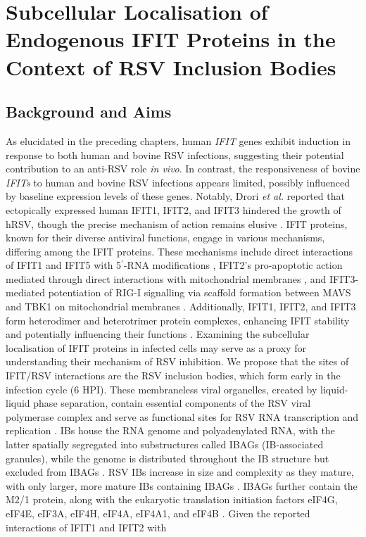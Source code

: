 \chapter{Subcellular Localisation of Endogenous IFIT Proteins in the Context of RSV Inclusion Bodies} \label{ch:Subcellular Localisation of Endogenous IFIT Proteins in the Context of RSV Inclusion Bodies}
\section{Background and Aims} \label{sec:Background and Aims-Chapter3}
As elucidated in the preceding chapters, human \textit{IFIT} genes exhibit induction in response to both human and bovine RSV infections, suggesting their potential contribution to an anti-RSV role \textit{in vivo}. In contrast, the responsiveness of bovine \textit{IFITs} to human and bovine RSV infections appears limited, possibly influenced by baseline expression levels of these genes. Notably, Drori \textit{et al.} reported that ectopically expressed human IFIT1, IFIT2, and IFIT3 hindered the growth of hRSV, though the precise mechanism of action remains elusive \cite{Drori2020InfluenzaProteins}. IFIT proteins, known for their diverse antiviral functions, engage in various mechanisms, differing among the IFIT proteins. These mechanisms include direct interactions of IFIT1 and IFIT5 with 5$^{\prime}$-RNA modifications \cite{Abbas2013StructuralProteins, Diamond2014IFIT1:Translation}, IFIT2's pro-apoptotic action mediated through direct interactions with mitochondrial membranes \cite{Chen2017InhibitionApoptosis}, and IFIT3-mediated potentiation of RIG-I signalling via scaffold formation between MAVS and TBK1 on mitochondrial membranes \cite{Liu2011IFN-InducedTBK1}. Additionally, IFIT1, IFIT2, and IFIT3 form heterodimer and heterotrimer protein complexes, enhancing IFIT stability and potentially influencing their functions \cite{Mears2018BetterResponse}. Examining the subcellular localisation of IFIT proteins in infected cells may serve as a proxy for understanding their mechanism of RSV inhibition. We propose that the sites of IFIT/RSV interactions are the RSV inclusion bodies, which form early in the infection cycle (6 HPI). These membraneless viral organelles, created by liquid-liquid phase separation, contain essential components of the RSV viral polymerase complex and serve as functional sites for RSV RNA transcription and replication \cite{Rincheval2017FunctionalVirus, Weber1995NonstructuralSerum, Fricke2013P38Assembly, Jobe2021BovineResponses}. IBs house the RNA genome and polyadenylated RNA, with the latter spatially segregated into substructures called IBAGs (IB-associated granules), while the genome is distributed throughout the IB structure but excluded from IBAGs \cite{Rincheval2017FunctionalVirus}. RSV IBs increase in size and complexity as they mature, with only larger, more mature IBs containing IBAGs \cite{Rincheval2017FunctionalVirus, Jobe2021BovineResponses}. IBAGs further contain the M2/1 protein, along with the eukaryotic translation initiation factors eIF4G, eIF4E, eIF3A, eIF4H, eIF4A, eIF4A1, and eIF4B \cite{Rincheval2017FunctionalVirus, Jobe2024ViralCondensates}. Given the reported interactions of IFIT1 and IFIT2 with 